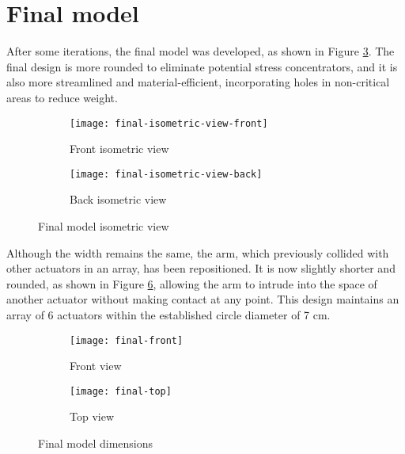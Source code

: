 \section{Final model}

After some iterations, the final model was developed, as shown in Figure \ref{fig:final-isometric-view}. The final design is more rounded to eliminate potential stress concentrators, and it is also more streamlined and material-efficient, incorporating holes in non-critical areas to reduce weight.

\begin{figure}[H]
    \centering
    \begin{subfigure}[b]{0.4\textwidth}
        \texttt{[image: final-isometric-view-front]}
        \caption{Front isometric view}
        \label{fig:final-front-isometric-view}
    \end{subfigure}
    \begin{subfigure}[b]{0.4\textwidth}
        \texttt{[image: final-isometric-view-back]}
        \caption{Back isometric view}
        \label{fig:final-back-isometric-view}
    \end{subfigure}
    \caption{Final model isometric view}
    \label{fig:final-isometric-view}
\end{figure}

Although the width remains the same, the arm, which previously collided with other actuators in an array, has been repositioned. It is now slightly shorter and rounded, as shown in Figure \ref{fig:final-model-dimensions}, allowing the arm to intrude into the space of another actuator without making contact at any point. This design maintains an array of 6 actuators within the established circle diameter of 7 cm.

\begin{figure}[H]
    \centering
    \begin{subfigure}[b]{0.316\textwidth}
        \texttt{[image: final-front]}
        \caption{Front view}
        \label{fig:final-frontal}
    \end{subfigure}
    \begin{subfigure}[b]{0.584\textwidth}
        \texttt{[image: final-top]}
        \caption{Top view}
        \label{fig:first-top}
    \end{subfigure}
    \caption{Final model dimensions}
    \label{fig:final-model-dimensions}
\end{figure}

